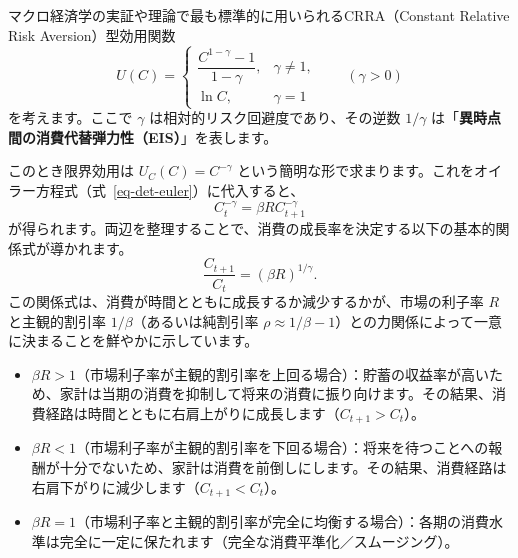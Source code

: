 \documentclass[
  japanese,
  lualatex,
  ja=standard,
  12pt,
  a4paper]{ltjsarticle}
\providecommand{\tightlist}{%
  \setlength{\itemsep}{0pt}\setlength{\parskip}{0pt}}
\begin{document}
\begin{tcolorbox}[enhanced jigsaw, arc=.35mm, bottomrule=.15mm, bottomtitle=1mm, breakable, colback=white, colbacktitle=quarto-callout-tip-color!10!white, colframe=quarto-callout-tip-color-frame, coltitle=black, left=2mm, leftrule=.75mm, opacityback=0, opacitybacktitle=0.6, rightrule=.15mm, title=\textcolor{quarto-callout-tip-color}{\faLightbulb}\hspace{0.5em}{CRRA（等弾力的）効用関数における具体例}, titlerule=0mm, toprule=.15mm, toptitle=1mm]

マクロ経済学の実証や理論で最も標準的に用いられるCRRA（Constant Relative
Risk Aversion）型効用関数 \[
U(C) =
\begin{cases}
\dfrac{C^{1-\gamma}-1}{1-\gamma}, & \gamma \neq 1,\\
\ln C, & \gamma = 1
\end{cases}
\qquad (\gamma > 0)
\] を考えます。ここで \(\gamma\) は相対的リスク回避度であり、その逆数
\(1/\gamma\) は「\textbf{異時点間の消費代替弾力性（EIS）}」を表します。

このとき限界効用は \(U_C(C) = C^{-\gamma}\)
という簡明な形で求まります。これをオイラー方程式（式~\ref{eq-det-euler}）に代入すると、
\[
C_t^{-\gamma} = \beta R C_{t+1}^{-\gamma}
\]
が得られます。両辺を整理することで、消費の成長率を決定する以下の基本的関係式が導かれます。
\[
\frac{C_{t+1}}{C_t} = (\beta R)^{1/\gamma}.
\] この関係式は、消費が時間とともに成長するか減少するかが、市場の利子率
\(R\) と主観的割引率 \(1/\beta\)（あるいは純割引率
\(\rho \approx 1/\beta - 1\)）との力関係によって一意に決まることを鮮やかに示しています。

\begin{itemize}
\tightlist
\item
  \(\beta R > 1\)（市場利子率が主観的割引率を上回る場合）：貯蓄の収益率が高いため、家計は当期の消費を抑制して将来の消費に振り向けます。その結果、消費経路は時間とともに右肩上がりに成長します（\(C_{t+1} > C_t\)）。
\item
  \(\beta R < 1\)（市場利子率が主観的割引率を下回る場合）：将来を待つことへの報酬が十分でないため、家計は消費を前倒しにします。その結果、消費経路は右肩下がりに減少します（\(C_{t+1} < C_t\)）。
\item
  \(\beta R = 1\)（市場利子率と主観的割引率が完全に均衡する場合）：各期の消費水準は完全に一定に保たれます（完全な消費平準化／スムージング）。
\end{itemize}

\end{tcolorbox}
\end{document}
